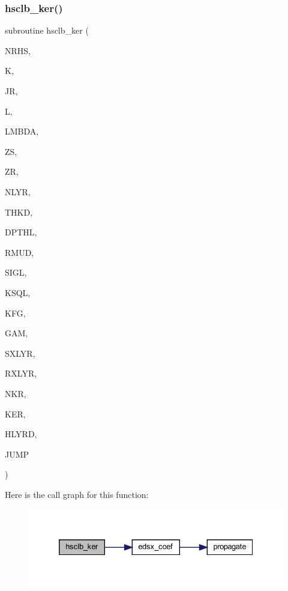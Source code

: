 \subsubsection{\texorpdfstring{hsclb\+\_\+ker()}{hsclb\_ker()}}
{\footnotesize\ttfamily subroutine hsclb\+\_\+ker (\begin{DoxyParamCaption}\item[{integer}]{N\+R\+HS,  }\item[{integer}]{K,  }\item[{integer}]{JR,  }\item[{integer}]{L,  }\item[{real(kind=ql)}]{L\+M\+B\+DA,  }\item[{real(kind=ql)}]{ZS,  }\item[{real(kind=ql)}]{ZR,  }\item[{integer}]{N\+L\+YR,  }\item[{real(kind=ql), dimension (nlyr)}]{T\+H\+KD,  }\item[{real(kind=ql), dimension (nlyr)}]{D\+P\+T\+HL,  }\item[{real(kind=ql), dimension(0\+:nlyr)}]{R\+M\+UD,  }\item[{complex(kind=ql), dimension (nlyr)}]{S\+I\+GL,  }\item[{complex(kind=ql), dimension (nlyr)}]{K\+S\+QL,  }\item[{integer}]{K\+FG,  }\item[{integer}]{G\+AM,  }\item[{integer}]{S\+X\+L\+YR,  }\item[{integer}]{R\+X\+L\+YR,  }\item[{integer}]{N\+KR,  }\item[{complex(kind=ql), dimension(jnlo-\/nrhs\+:jnhi,nkr)}]{K\+ER,  }\item[{complex(kind=ql), dimension(nrhs,3)}]{H\+L\+Y\+RD,  }\item[{logical}]{J\+U\+MP }\end{DoxyParamCaption})}

Here is the call graph for this function\+:\nopagebreak
\begin{figure}[H]
\begin{center}
\leavevmode
\includegraphics[width=332pt]{Leroi__c_8f90_ab053f1c7997499ed6fca932a2f8cbecb_cgraph}
\end{center}
\end{figure}
\mbox{\label{Leroi__c_8f90_a8e78b7efe3dc41645eaf9123100f4fc1}} 
